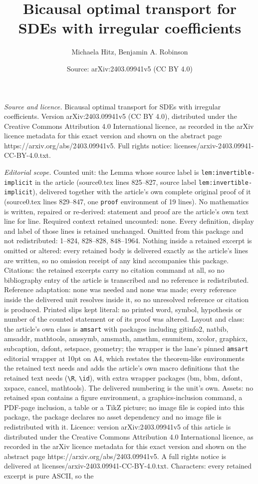 \documentclass[10pt,a4paper]{amsart}
\title[Bicausal optimal transport for SDEs with irregular coefficie]{Bicausal optimal transport for SDEs with irregular coefficients}
\author{Michaela Hitz, Benjamin A. Robinson}
\date{Source: arXiv:2403.09941v5 (CC BY 4.0)}
\begin{document}
\maketitle

\noindent\emph{Source and licence.} Bicausal optimal transport for SDEs with irregular coefficients. Version arXiv:2403.09941v5 (CC BY 4.0), distributed under the Creative Commons Attribution 4.0 International licence, as recorded in the arXiv licence metadata for this exact version and shown on the abstract page https://arxiv.org/abs/2403.09941v5. Full rights notice: licenses/arxiv-2403.09941-CC-BY-4.0.txt.\par\smallskip

\noindent\textit{Editorial scope.} Counted unit: the Lemma whose source label is \texttt{lem:invertible-implicit} in the article (source0.tex lines 825--827, source label \texttt{lem:invertible-implicit}), delivered together with the article's own complete original proof of it (source0.tex lines 829--847, one \texttt{proof} environment of 19 lines). No mathematics is written, repaired or re-derived: statement and proof are the article's own text line for line. Required context retained uncounted: none. Every definition, display and label of those lines is retained unchanged. Omitted from this package and not redistributed: 1--824, 828--828, 848--1964. Nothing inside a retained excerpt is omitted or altered: every retained body is delivered exactly as the article's lines are written, so no omission receipt of any kind accompanies this package. Citations: the retained excerpts carry no citation command at all, so no bibliography entry of the article is transcribed and no reference is redistributed. Reference adaptation: none was needed and none was made; every reference inside the delivered unit resolves inside it, so no unresolved reference or citation is produced. Printed slips kept literal: no printed word, symbol, hypothesis or number of the counted statement or of its proof was altered. Layout and class: the article's own class is \texttt{amsart} with packages including gitinfo2, natbib, amsaddr, mathtools, amssymb, amsmath, amsthm, enumitem, xcolor, graphicx, subcaption, dsfont, setspace, geometry; the wrapper is the lane's pinned \texttt{amsart} editorial wrapper at 10pt on A4, which restates the theorem-like environments the retained text needs and adds the article's own macro definitions that the retained text needs (\texttt{\textbackslash R}, \texttt{\textbackslash id}), with extra wrapper packages (bm, bbm, dsfont, xspace, cancel, mathtools). The delivered numbering is the unit's own. Assets: no retained span contains a figure environment, a graphics-inclusion command, a PDF-page inclusion, a table or a TikZ picture; no image file is copied into this package, the package declares no asset dependency and no image file is redistributed with it. Licence: version arXiv:2403.09941v5 of this article is distributed under the Creative Commons Attribution 4.0 International licence, as recorded in the arXiv licence metadata for this exact version and shown on the abstract page https://arxiv.org/abs/2403.09941v5. A full rights notice is delivered at licenses/arxiv-2403.09941-CC-BY-4.0.txt. Characters: every retained excerpt is pure ASCII, so the 
\end{document}
